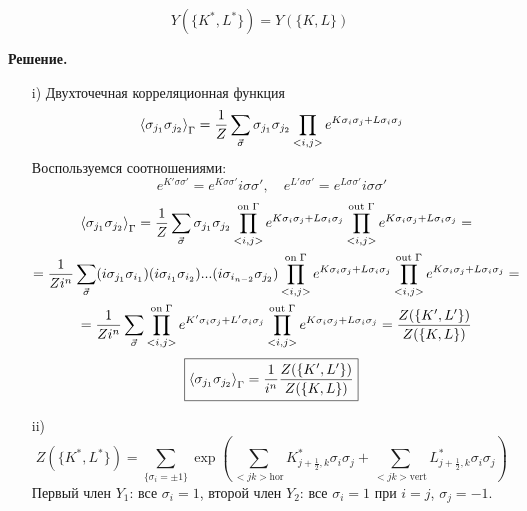 \documentclass[12pt]{article}
\theoremstyle{definition}
\begin{document}
\begin{enumerate}
\begin{itemize}
\begin{equation}
        Y(\{K^*,L^*\})=Y(\{K,L\})
    \end{equation}
\end{itemize}
\textbf{Решение.}
\begin{itemize}
    \item[i)] Двухточечная корреляционная функция
    \begin{equation}
        \braket{\sigma_{j_1}\sigma_{j_2}}_\Gamma=\frac{1}{Z}\sum\limits_{\vec{\sigma}}\sigma_{j_1}\sigma_{j_2}\prod\limits_{<i,j>}e^{K\sigma_i\sigma_j+L\sigma_i\sigma_j}
    \end{equation}
    Воспользуемся соотношениями:
    \begin{equation}
        e^{K'\sigma\sigma'}=e^{K\sigma\sigma'}i\sigma\sigma',\quad e^{L'\sigma\sigma'}=e^{L\sigma\sigma'}i\sigma\sigma'
    \end{equation}
    \begin{multline}
        \braket{\sigma_{j_1}\sigma_{j_2}}_\Gamma=\frac{1}{Z}\sum\limits_{\vec{\sigma}}\sigma_{j_1}\sigma_{j_2}\prod\limits_{<i,j>}^{\text{on}\;\Gamma}e^{K\sigma_i\sigma_j+L\sigma_i\sigma_j}\prod\limits_{<i,j>}^{\text{out}\;\Gamma}e^{K\sigma_i\sigma_j+L\sigma_i\sigma_j}=\\=\frac{1}{Zi^n}\sum\limits_{\vec{\sigma}}(i\sigma_{j_1}\sigma_{i_1})(i\sigma_{i_1}\sigma_{i_2})...(i\sigma_{i_{n-2}}\sigma_{j_2})\prod\limits_{<i,j>}^{\text{on}\;\Gamma}e^{K\sigma_i\sigma_j+L\sigma_i\sigma_j}\prod\limits_{<i,j>}^{\text{out}\;\Gamma}e^{K\sigma_i\sigma_j+L\sigma_i\sigma_j}=\\=\frac{1}{Zi^n}\sum\limits_{\vec{\sigma}}\prod\limits_{<i,j>}^{\text{on}\;\Gamma}e^{K'\sigma_i\sigma_j+L'\sigma_i\sigma_j}\prod\limits_{<i,j>}^{\text{out}\;\Gamma}e^{K\sigma_i\sigma_j+L\sigma_i\sigma_j}=\frac{Z(\{K',L'\})}{Z(\{K,L\})}
    \end{multline}
    \begin{equation}
         \boxed{\braket{\sigma_{j_1}\sigma_{j_2}}_\Gamma=\frac{1}{i^n}\frac{Z(\{K',L'\})}{Z(\{K,L\})}}
    \end{equation}
    \item[ii)] 
    \begin{equation}
        Z(\{K^*,L^*\})=\sum\limits_{\{\sigma_i=\pm1\}}\exp\left(\sum\limits_{<jk>\text{hor}}K^*_{j+\frac{1}{2},k}\sigma_i\sigma_j+\sum\limits_{<jk>\text{vert}}L^*_{j+\frac{1}{2},k}\sigma_i\sigma_j\right)
    \end{equation}
    Первый член $Y_1$: все $\sigma_i=1$, второй член $Y_2$: все $\sigma_i=1$ при $i=j$, $\sigma_j=-1$.
    \begin{multline}

\end{multline}
\end{itemize}
\end{enumerate}
\end{document}
